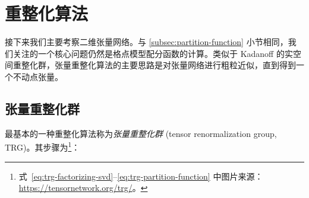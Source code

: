 \section{重整化算法}
\label{sec:tensor-network-rg}

接下来我们主要考察二维张量网络。与 \ref{subsec:partition-function} 小节相同，我们关注的一个核心问题仍然是格点模型配分函数的计算。类似于 Kadanoff 的实空间重整化群\cite{pathria2011statistical}，张量重整化算法的主要思路是对张量网络进行粗粒近似，直到得到一个不动点张量。

\subsection{张量重整化群}

最基本的一种重整化算法称为\emph{张量重整化群} (tensor renormalization group, TRG)\cite{levin2007tensor}。其步骤为\footnote{式~\eqref{eq:trg-factorizing-svd}--\eqref{eq:trg-partition-function} 中图片来源：\url{https://tensornetwork.org/trg/}。}：

